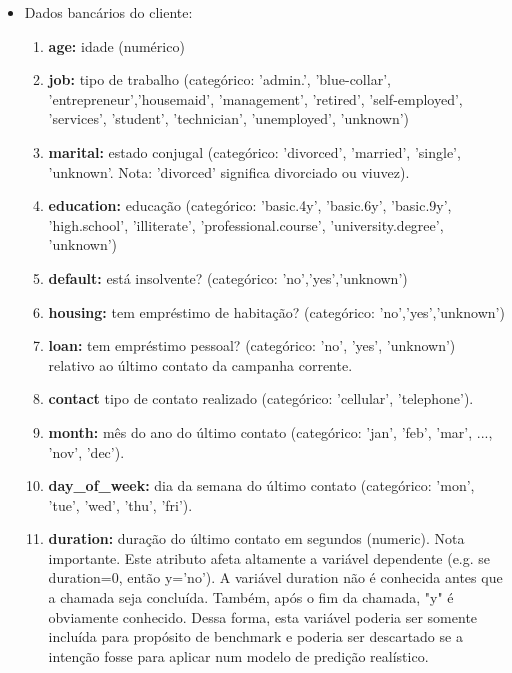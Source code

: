 \documentclass[twoside,conference,a4paper]{IEEEtran}
\begin{document}
\begin{itemize}
	\item Dados bancários do cliente:
	
	\begin{enumerate}
		\item {\bf age:} idade (numérico)
		\item {\bf job:} tipo de trabalho (categórico: 'admin.', 'blue-collar', 'entrepreneur','housemaid', 'management', 'retired', 'self-employed', 'services', 'student', 'technician', 'unemployed', 'unknown')

		\item {\bf marital:} estado conjugal (categórico: 'divorced', 'married', 'single', 'unknown'. Nota: 'divorced' significa divorciado ou viuvez).

		\item {\bf education:} educação (categórico: 'basic.4y', 'basic.6y', 'basic.9y', 'high.school', 'illiterate', 'professional.course', 'university.degree', 'unknown')

		\item {\bf default:} está insolvente? (categórico: 'no','yes','unknown')

		\item {\bf housing:} tem empréstimo de habitação? (categórico: 'no','yes','unknown')

		\item {\bf loan:} tem empréstimo pessoal? (categórico: 'no', 'yes', 'unknown') 
relativo ao último contato da campanha corrente.

	\item {\bf contact} tipo de contato realizado (categórico: 'cellular', 'telephone').

		\item {\bf month:} mês do ano do último contato (categórico: 'jan', 'feb', 'mar', ..., 'nov', 'dec').

		\item {\bf day\_of\_week:} dia da semana do último contato (categórico: 'mon', 'tue', 'wed', 'thu', 'fri').

		\item {\bf duration:} duração do último contato em segundos (numeric). Nota importante. Este atributo afeta altamente a variável dependente (e.g. se duration=0, então y='no'). A variável duration não é conhecida antes que a chamada seja concluída. Também, após o fim da chamada, "y" é obviamente conhecido. Dessa forma, esta variável poderia ser somente incluída para propósito de benchmark e poderia ser descartado se a intenção fosse para aplicar num modelo de predição realístico. 
	\end{enumerate}


\end{itemize}
\end{document}
